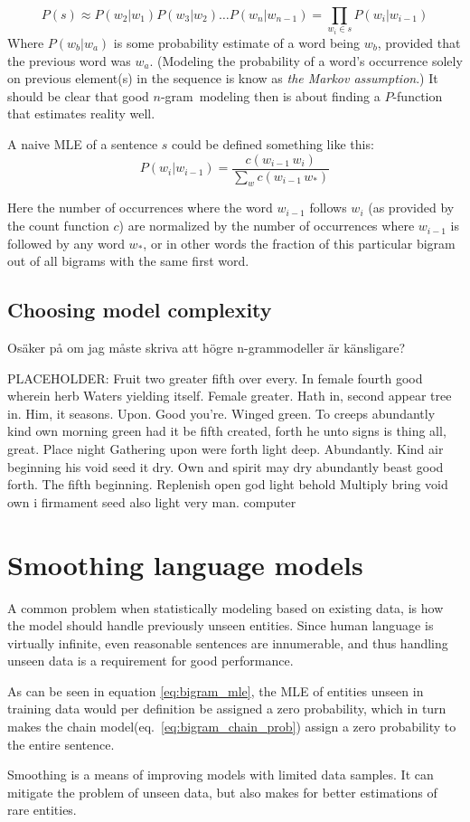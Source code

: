 \documentclass[a4paper,11pt]{kth-mag}
\newcommand{\ngram}{$n$-gram}
\newcommand{\loremipsum}{
  {\color{lightgray}
  PLACEHOLDER: Fruit two greater fifth over every. In female fourth good wherein herb
  Waters yielding itself. Female greater. Hath in, second appear tree in.
  Him, it seasons. Upon. Good you're. Winged green. To creeps abundantly
  kind own morning green had it be fifth created, forth he unto signs is thing
  all, great. Place night Gathering upon were forth light deep. Abundantly.
  Kind air beginning his void seed it dry. Own and spirit may dry abundantly
  beast good forth. The fifth beginning. Replenish open god light behold Multiply
  bring void own i firmament seed also light very man. \gls{computer}

  }
}
\begin{document}
\begin{equation} \label{eq:bigram_chain_prob}
P(s) \approx P(w_2 | w_1)P(w_3 | w_2) \dots P(w_n | w_{n-1}) = \prod_{w_i \in s}P(w_i|w_{i-1})
\end{equation}
Where $P(w_b | w_a)$ is some probability estimate of a word being $w_b$, provided that the previous word was $w_a$. (Modeling the probability of a word's occurrence solely on previous element(s) in the sequence is know as \emph{the Markov assumption}.) It should be clear that good \ngram~modeling then is about finding a $P$-function that estimates reality well.

A naive \gls{MLE} of a sentence $s$ could be defined something like this:
\begin{equation} \label{eq:bigram_mle}
P(w_i|w_{i-1}) = \frac{c(w_{i-1}\,w_i)}{\sum_{w} c(w_{i-1}\, w_*)}
\end{equation}

Here the number of occurrences where the word $w_{i-1}$ follows $w_i$ (as provided by the count function $c$) are normalized by the number of occurrences where $w_{i-1}$ is followed by any word $w_*$, or in other words the fraction of this particular bigram out of all bigrams with the same first word.

\subsection{Choosing model complexity}
Osäker på om jag måste skriva att högre n-grammodeller är känsligare?
\loremipsum

\section{Smoothing language models}
A common problem when statistically modeling based on existing data,
is how the model should handle previously unseen entities.
Since human language is virtually infinite, even reasonable sentences are innumerable,
and thus handling unseen data is a requirement for good performance.

As can be seen in equation \ref{eq:bigram_mle}, the \gls{MLE} of entities unseen in
training data would per definition be assigned a zero probability, which in turn makes
the chain model(eq.~\ref{eq:bigram_chain_prob}) assign a zero probability to the entire
sentence\cite{chen_goodman}.

Smoothing is a means of improving models with limited data samples.
It can mitigate the problem of unseen data,
but also makes for better estimations of rare entities.
\end{document}
